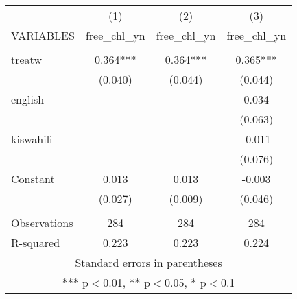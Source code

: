 \documentclass[]{article}
\begin{document}
\begin{tabular}{lccc} \hline
 & (1) & (2) & (3) \\
VARIABLES & free\_chl\_yn & free\_chl\_yn & free\_chl\_yn \\ \hline
 &  &  &  \\
treatw & 0.364*** & 0.364*** & 0.365*** \\
 & (0.040) & (0.044) & (0.044) \\
english &  &  & 0.034 \\
 &  &  & (0.063) \\
kiswahili &  &  & -0.011 \\
 &  &  & (0.076) \\
Constant & 0.013 & 0.013 & -0.003 \\
 & (0.027) & (0.009) & (0.046) \\
 &  &  &  \\
Observations & 284 & 284 & 284 \\
 R-squared & 0.223 & 0.223 & 0.224 \\ \hline
\multicolumn{4}{c}{ Standard errors in parentheses} \\
\multicolumn{4}{c}{ *** p$<$0.01, ** p$<$0.05, * p$<$0.1} \\
\end{tabular}
\end{document}
